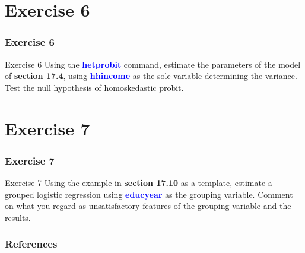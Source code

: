 \documentclass[11pt, aspectratio=169]{beamer}
\begin{document}
	\section{Exercise 6}
		\begin{frame}
			\frametitle{Exercise 6}
			\begin{block}{Exercise 6}
				Using the \textcolor{blue}{\textbf{hetprobit}} command, estimate the parameters of the model
				of \textcolor{red!50}{\textbf{section 17.4}}, using \textcolor{blue}{\textbf{hhincome}} as the sole variable determining the
				variance. Test the null hypothesis of homoskedastic probit.
			\end{block}
		\end{frame}
	\section{Exercise 7}
		\begin{frame}
			\frametitle{Exercise 7}
			\begin{block}{Exercise 7}
				Using the example in \textcolor{red!50}{\textbf{section 17.10}} as a template, estimate a grouped
				logistic regression using \textcolor{blue}{\textbf{educyear}} as the grouping variable. Comment
				on what you regard as unsatisfactory features of the grouping variable
				and the results.
			\end{block}
		\end{frame}
	\begin{frame}[t,allowframebreaks]
		\frametitle{References}
		
		
		\nocite{cameron2022-I}
		\nocite{cameron2022-II}
	\end{frame}
	\begin{frame}
		\maketitle
	\end{frame}
\end{document}
